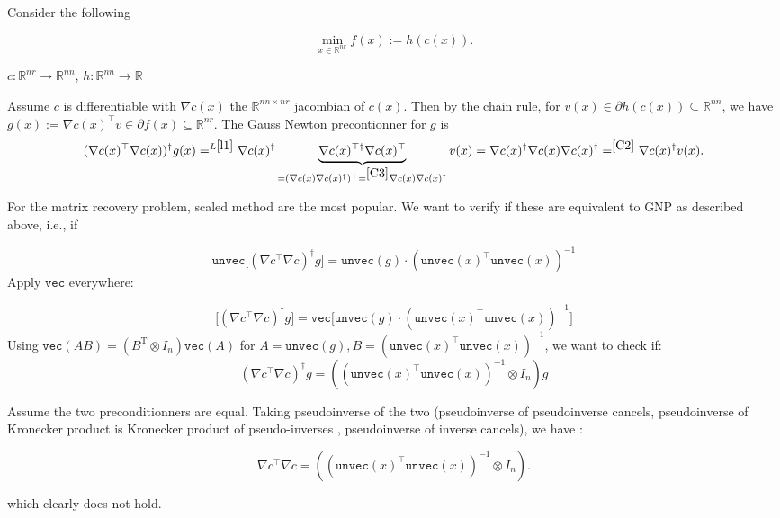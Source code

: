 \documentclass{article}
\begin{document}
Consider the following

$$
\min_{x\in \mathbb{R}^{nr} } f(x):= h(c(x)).

$$

$c: \mathbb{R}^{nr} \to \mathbb{R}^{nn}$, $h:\mathbb{R}^{nn} \to \mathbb{R}$


Assume $c$ is differentiable with $\nabla c(x)$ the $\mathbb{R}^{nn \times nr}$ jacombian of $c(x)$. Then by the chain rule, for $v(x) \in \partial h ( c(x)) \subseteq \mathbb{R}^{nn}$,  we have $g(x):= \nabla c(x)^{\top} v  \in \partial f(x) \subseteq \mathbb{R}^{nr}$. The Gauss Newton precontionner for $g$ is 
$$
(\nabla c(x)^\top \nabla c(x))^{\dagger} g(x) =^{L\ref{l1}}   \nabla c(x)^\dagger \underbrace{\nabla c(x)^{\top \dagger } \nabla c(x)^\top}_{ = (\nabla c(x) \nabla c(x)^\dagger)^\top =^{\ref{C3}} \nabla c(x) \nabla c(x)^\dagger  } v(x)  = \nabla c(x)^\dagger \nabla c(x) \nabla c(x)^\dagger =^{\ref{C2}} \nabla c(x)^\dagger v(x).
$$


For the matrix recovery problem,  scaled method are the most popular. We want to verify if these are equivalent to GNP as described above, i.e., if


$$
\texttt{unvec}\big[(\nabla c^\top \nabla c)^\dagger g  \big]  = \texttt{unvec}(g) \cdot (\texttt{unvec}(x)^\top \texttt{unvec}(x))^{-1}
$$
Apply $\texttt{vec}$ everywhere:

$$
\big[(\nabla c^\top \nabla c)^\dagger g  \big]  = \texttt{vec} \big[ \texttt{unvec}(g) \cdot (\texttt{unvec}(x)^\top \texttt{unvec}(x))^{-1} \big ]
$$
Using $\texttt{vec}(AB) = (B^{\mathrm{T}} \otimes I_{n})\texttt{vec}(A)$ for $A=\texttt{unvec}(g), B=(\texttt{unvec}(x)^\top \texttt{unvec}(x))^{-1}$, we want to check if:
$$
(\nabla c^\top \nabla c)^\dagger  g = ((\texttt{unvec}(x)^\top \texttt{unvec}(x))^{-1}\otimes I_{n}) g
$$

Assume the two preconditionners are equal. Taking pseudoinverse of the two (pseudoinverse of pseudoinverse cancels, pseudoinverse of Kronecker product is Kronecker product of pseudo-inverses \cite{Langville2004Kronecker}, pseudoinverse of inverse cancels), we have :

$$
\nabla c^\top \nabla c = ((\texttt{unvec}(x)^\top \texttt{unvec}(x))^{-1}\otimes I_{n}).
$$

which clearly does not hold. 




\end{document}
